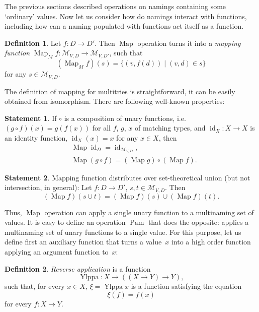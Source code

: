 \documentclass{article}
\theoremstyle{definition}
\newtheorem{Df}{Definition}
\newtheorem{St}{Statement}
\newcommand{\setcharmvcn}{M}
\newcommand{\setsymbol}[3]{\mathcal{#1}_{#2,#3}}
\newcommand{\setmvcn}[2]{\setsymbol{\setcharmvcn}{#1}{#2}}
\newcommand{\fmap}{\operatorname{Map}}
\newcommand{\fpam}{\operatorname{Pam}}
\newcommand{\id}{\operatorname{id}}
\newcommand{\ylppa}{\operatorname{Ylppa}}
\begin{document}
The previous sections described operations on namings containing some
`ordinary' values. Now let us consider how do namings interact with
functions, including how can a naming populated with functions act itself
as a function.

\begin{Df}\label{df:mvcn-map}
Let $f : D \to D'$. Then $\fmap$ operation turns it into a \emph{mapping
function} $\fmap_{\setcharmvcn} f : \setmvcn{V}{D} \to \setmvcn{V}{D'}$, such
that
\[
  (\fmap_{\setcharmvcn} f)(s) = \{ (v, f(d)) \mid (v, d) \in s \}
\]
for any $s \in \setmvcn{V}{D}$.
\end{Df}

The definition of mapping for multitries is straightforward, it can be easily
obtained from isomorphism. There are following well-known properties:

\begin{St}\label{st:map-properties}
If $\circ$ is a composition of unary functions, i.e. $(g\circ f)(x) = g(f(x))$ for
all $f$, $g$, $x$ of matching types, and $\id_X : X \to X$ is an identity function,
$\id_X(x) = x$ for any $x\in X$, then
\begin{eqnarray*}
  & \fmap \id_D = \id_{\setmvcn{V}{D}} , \\
  & \fmap (g \circ f) = (\fmap g) \circ (\fmap f) .
\end{eqnarray*}
\end{St}

\begin{St}\label{st:map-distributivity}
Mapping function distributes over set-theoretical union (but not intersection, in general):
Let $f: D \to D'$, $s, t \in \setmvcn{V}{D}$. Then
\[
  (\fmap f) (s \cup t) = (\fmap f)(s) \cup (\fmap f)(t) .
\]
\end{St}

Thus, $\fmap$ operation can apply a single unary function to a multinaming set of
values. It is easy to define an operation $\fpam$ that does the opposite:
applies a multinaming set of unary functions to a single value. For this purpose,
let us define first an auxiliary function that turns a value~$x$ into a
high order function applying an argument function to~$x$:

\begin{Df}\label{df:ylppa}
\emph{Reverse application} is a function
\[
  \ylppa : X \to ((X \to Y) \to Y),
\]
such that, for every $x\in X$, $\xi = \ylppa x$ is a function satisfying the
equation
\[
  \xi(f) = f(x)
\]
for every $f: X\to Y$.
\end{Df}
\end{document}

